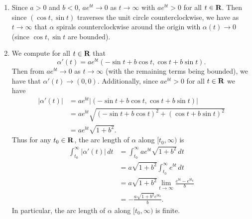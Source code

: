 \begin{ex}
\begin{enumerate}
\item Since $a > 0$ and $b < 0$, $ae^{bt} \to 0$ as $t\to\infty$ with $ae^{bt} > 0$ for all $t \in \mathbf{R}$. Then since $(\cos t, \sin t)$ traverses the unit circle counterclockwise, we have as $t\to\infty$ that $\alpha$ spirals counterclockwise around the origin with $\alpha(t) \to 0$ (since $\cos t, \sin t$ are bounded).

\item We compute for all $t \in \mathbf{R}$ that \[\alpha'(t) = ae^{bt}(-\sin t + b\cos t, \cos t + b\sin t).\] Then from $ae^{bt} \to 0$ as $t\to\infty$ (with the remaining terms being bounded), we have that $\alpha'(t) \to (0, 0)$. Additionally, since $ae^{bt} > 0$ for all $t \in \mathbf{R}$ we have
\begin{align*}
|\alpha'(t)| & = ae^{bt}|(-\sin t + b\cos t, \cos t + b\sin t)|\\
& = ae^{bt}\sqrt{(-\sin t + b\cos t)^2 + (\cos t + b\sin t)^2}\\
& = ae^{bt}\sqrt{1 + b^2}.
\end{align*}
Thus for any $t_0 \in \mathbf{R}$, the arc length of $\alpha$ along $[t_0, \infty)$ is
\begin{align*}
\int_{t_0}^{\infty}|\alpha'(t)|\,dt & = \int_{t_0}^{\infty}ae^{bt}\sqrt{1+b^2}\,dt\\
& = a\sqrt{1+b^2}\int_{t_0}^{\infty}e^{bt}\,dt\\
& = a\sqrt{1+b^2}\lim_{t\to\infty}\frac{e^{bt} - e^{bt_0}}{b}\\
& = -\frac{a\sqrt{1+b^2}e^{bt_0}}{b}.
\end{align*}
In particular, the arc length of $\alpha$ along $[t_0, \infty)$ is finite.
\end{enumerate}
\end{ex}

